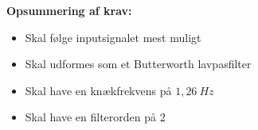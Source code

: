 \vspace{3mm}
\textbf{Opsummering af krav:}
\begin{itemize}
\item[\text{\sffamily \checkmark}] Skal følge inputsignalet mest muligt  
\item[\text{\sffamily \checkmark}] Skal udformes som et Butterworth lavpasfilter
\item[\text{\sffamily \checkmark}] Skal have en knækfrekvens på $1,26~Hz$
\item[\text{\sffamily \checkmark}] Skal have en filterorden på 2
\end{itemize}